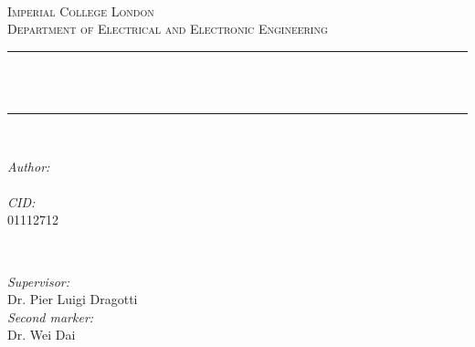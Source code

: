 \begin{titlepage}

\newcommand{\HRule}{\rule{\linewidth}{0.5mm}} %


\center %

\quad\\[1.5cm]
\textsc{\Large Imperial College London}\\[0.5cm] %
\textsc{\large Department of Electrical and Electronic Engineering}\\[0.5cm] %

\makeatletter
\HRule \\[0.4cm]
{ \huge \bfseries \@title}\\[0.4cm] %
\HRule \\[1.5cm]
 

\begin{minipage}{0.4\textwidth}
\begin{flushleft} \large
\emph{Author:}\\
\@author\\ %
\emph{CID:}\\
01112712\\
\end{flushleft}
\end{minipage}
~
\begin{minipage}{0.4\textwidth}
\begin{flushright} \large
\emph{Supervisor:} \\
Dr. Pier Luigi Dragotti \\
\emph{Second marker:} \\
Dr. Wei Dai
\end{flushright}
\end{minipage}\\[3cm]
\makeatother


\end{titlepage}
